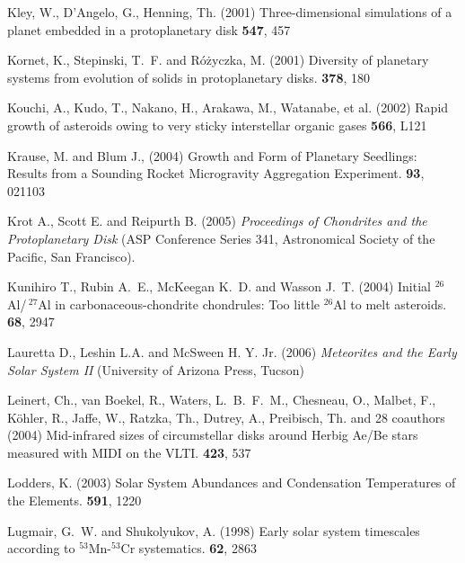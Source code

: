 \begin{literature}
\item
Kley, W., D'Angelo, G., Henning, Th. (2001)  Three-dimensional simulations
 of a planet embedded in a protoplanetary disk  \apj \textbf{547}, 457

\item
Kornet, K., Stepinski, T.~F. and R\'o\.zyczka, M. (2001) Diversity of
planetary systems from evolution of solids in protoplanetary disks. \aap
\textbf{378}, 180

\item
Kouchi, A., Kudo, T., Nakano, H., Arakawa, M., Watanabe, et al.
(2002) Rapid growth of asteroids owing to very sticky interstellar 
organic gases \apj \textbf{566}, L121

\item
Krause, M. and Blum J., (2004) Growth and Form of Planetary Seedlings: Results
from a Sounding Rocket Microgravity Aggregation Experiment.
\prl \textbf{93}, 021103

\item 
Krot A., Scott E. and Reipurth B. (2005)
         \textit{Proceedings of Chondrites and the Protoplanetary Disk}
         (ASP Conference Series 341, Astronomical Society of the 
         Pacific, San Francisco).

\item
Kunihiro T., Rubin A.~E., McKeegan K.~D. and Wasson J.~T. (2004)
Initial $^{26}$Al/\,$^{27}$Al in carbonaceous-chondrite chondrules: Too little
$^{26}$Al to melt asteroids. \gca \textbf{68}, 2947

\item
Lauretta D., Leshin L.A. and McSween H. Y. Jr. (2006)
         \textit{Meteorites and the Early Solar System II}
          (University of Arizona Press, Tucson)

\item
Leinert, Ch., van Boekel, R., Waters, L.~B.~F.~M., Chesneau, O., Malbet, F.,
K\"ohler, R., Jaffe, W., Ratzka, Th., Dutrey, A., Preibisch, Th. and 28
coauthors (2004) Mid-infrared sizes of circumstellar disks around Herbig
Ae/Be stars measured with MIDI on the VLTI. \aap \textbf{423}, 537

\item
Lodders, K. (2003) Solar System Abundances and Condensation Temperatures of
the Elements. \apj \textbf{591}, 1220

\item
Lugmair, G.~W. and Shukolyukov, A. (1998) Early solar system timescales
according to $^{53}$Mn-$^{53}$Cr systematics. \gca \textbf{62}, 2863


\end{literature}

